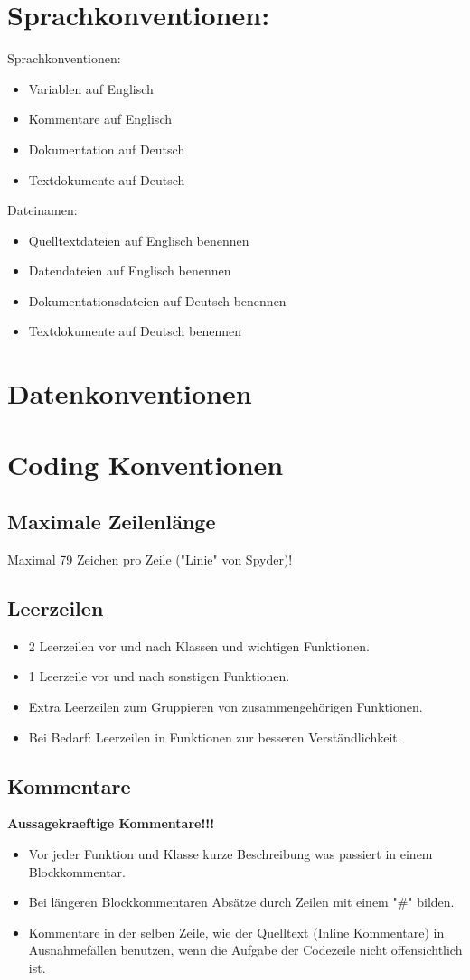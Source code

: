 \documentclass[11pt]{scrartcl}
\begin{document}
	\section{Sprachkonventionen:}
		Sprachkonventionen:
		\begin{itemize}
			\item Variablen auf Englisch
			\item Kommentare auf Englisch
			\item Dokumentation auf Deutsch
			\item Textdokumente auf Deutsch
		\end{itemize}
		Dateinamen:
		\begin{itemize}
			\item Quelltextdateien auf Englisch benennen
			\item Datendateien auf Englisch benennen
			\item Dokumentationsdateien auf Deutsch benennen
			\item Textdokumente auf Deutsch benennen
		\end{itemize}
	\section{Datenkonventionen}
	\section{Coding Konventionen}
		\subsection{Maximale Zeilenlänge}
			Maximal 79 Zeichen pro Zeile ("Linie" von Spyder)!
		\subsection{Leerzeilen}
			\begin{itemize}
				\item[] 2 Leerzeilen vor und nach Klassen und wichtigen Funktionen.
				\item[] 1 Leerzeile vor und nach sonstigen Funktionen.
				\item[] Extra Leerzeilen zum Gruppieren von zusammengehörigen Funktionen.
				\item[] Bei Bedarf: Leerzeilen in Funktionen zur besseren Verständlichkeit.
			\end{itemize}
		\subsection{Kommentare}
			\textbf{Aussagekraeftige Kommentare!!!}
			\begin{itemize}
				\item[] Vor jeder Funktion und Klasse kurze Beschreibung was passiert in einem Blockkommentar.
				\item[] Bei längeren Blockkommentaren Absätze durch Zeilen mit einem "\#" bilden.
				\item[] Kommentare in der selben Zeile, wie der Quelltext (Inline Kommentare) in Ausnahmefällen benutzen, wenn die Aufgabe der Codezeile nicht offensichtlich ist.
			\end{itemize}
\end{document}
